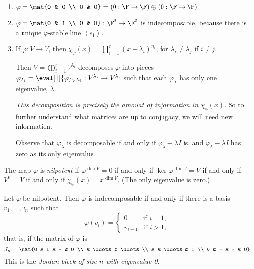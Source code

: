 \begin{examples}
\mbox{}
\begin{enumerate}
	\item $\varphi=\mat{0 & 0 \\ 0 & 0} = (0:\F\to\F) \oplus (0:\F\to\F)$
	\item $\varphi=\mat{0 & 1 \\ 0 & 0}:\F^2\to\F^2$ is indecomposable, because there is a unique $\varphi$-stable line $\left\langle e_1 \right\rangle$. %
	\item If $\varphi:V\to V$, then $\chi_\varphi(x) = \prod_{i=1}^r \left( x-\lambda_i \right)^{n_i}$, for $\lambda_i\neq \lambda_j$ if $i\neq j$. %
	
	Then $V=\bigoplus_{i=1}^r V^{\lambda_i}$ decomposes $\varphi$ into pieces $\varphi_{\lambda_i} = \eval[1]{\varphi}_{V^{\lambda_i}}:V^{\lambda_i} \to V^{\lambda_i}$ such that each $\varphi_\lambda$ has only one eigenvalue, $\lambda$. 

\emph{This decomposition is precisely the amount of information in} $\chi_\varphi(x)$. So to further understand what matrices are up to conjugacy, we will need new information.


Observe that $\varphi_\lambda$ is decomposable if and only if $\varphi_\lambda-\lambda I$ is, and $\varphi_\lambda-\lambda I$ has zero as its only eigenvalue.


\end{enumerate}
\end{examples}
\begin{definition}
	The map $\varphi$ is \emph{nilpotent} if $\varphi^{\dim V} = 0$ if and only if $\ker\varphi^{\dim V}=V$ if and only if $V^0=V$ if and only if $\chi_\varphi(x) = x^{\dim V}$. (The only eigenvalue is zero.) %

\end{definition}

\begin{theorem}
	Let $\varphi$ be nilpotent. Then $\varphi$ is indecomposable if and only if there is a basis $v_1,\ldots,v_n$ such that %
	\begin{equation*}
		\varphi(v_i) =
		\begin{cases}
			0 & \text{if } i=1, \\ %
			v_{i-1} & \text{if } i>1,
		\end{cases}
	\end{equation*}
	that is, if the matrix of $\varphi$ is
	\renewcommand{\arraystretch}{1.0}
	\begin{equation*}
		J_n = \mat{0 & 1 & ~ & 0 \\ & \ddots & \ddots \\ & & \ddots & 1 \\ 0 & ~ & ~ & 0} %
	\end{equation*}
	\drangarray
	This is the \emph{Jordan block of size $n$ with eigenvalue 0}.
	\label{thm:jordan-1}
\end{theorem}

